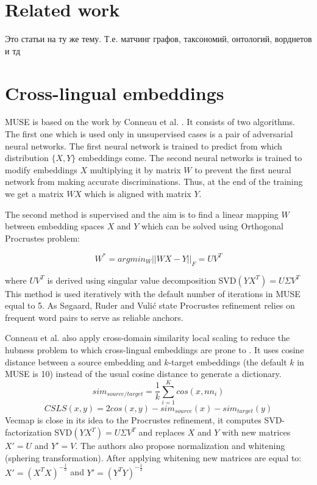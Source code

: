 \documentclass[11pt,a4paper]{article}
\begin{document}
\section{Related work}
\foreignlanguage{russian}{Это статьи на ту же тему. Т.е. матчинг графов, таксономий, онтологий, ворднетов и тд}
\section{Cross-lingual embeddings}

MUSE is based on the work by Conneau et al. \cite{muse}. It consists of two algorithms. The first one which is used only in unsupervised cases is a pair of adversarial neural networks. The first neural network is trained to predict from which distribution $\{X, Y\}$ embeddings come. The second neural networks is trained to modify embeddings $X$ multiplying it by matrix $W$ to prevent the first neural network from making accurate discriminations. Thus, at the end of the training we get a matrix $WX$ which is aligned with matrix $Y$.

The second method is supervised and the aim is to find a linear mapping $W$ between embedding spaces $X$ and $Y$ which can be solved using Orthogonal Procrustes problem:

$$ W^* = argmin_W ||WX - Y||_F = UV^T$$

where $UV^T$ is derived using singular value decomposition SVD$(YX^T) = U \Sigma V^T$
This method is used iteratively with the default number of iterations in MUSE equal to 5. As Søgaard, Ruder and Vulić state Procrustes refinement relies on frequent word pairs to serve as reliable anchors.

Conneau et al. also apply cross-domain similarity local scaling to reduce the hubness problem to which cross-lingual embeddings are prone to \cite{dinu}. It uses cosine distance between a source embedding and $k$-target embeddings (the default $k$ in MUSE is 10) instead of the usual cosine distance to generate a dictionary.
$$sim_{source/target} = \dfrac{1}{k}\sum_{i=1}^Kcos(x, nn_i)$$
\small
$$CSLS(x,y) = 2cos(x,y) - sim_{source}(x)  - sim_{target}(y)$$
\normalsize
Vecmap \cite{vecmap} is close in its idea to the Procrustes refinement, it computes SVD-factorization SVD$(YX^T) = U\Sigma V^T$ and replaces $X$ and $Y$ with new matrices $X' = U$ and $Y' = V$. The authors also propose normalization and whitening (sphering transformation). After applying whitening new matrices are equal to:
$X' = (X^TX)^{-\tfrac{1}{2}}$ and $Y' = (Y^TY)^{-\tfrac{1}{2}}$
\end{document}
